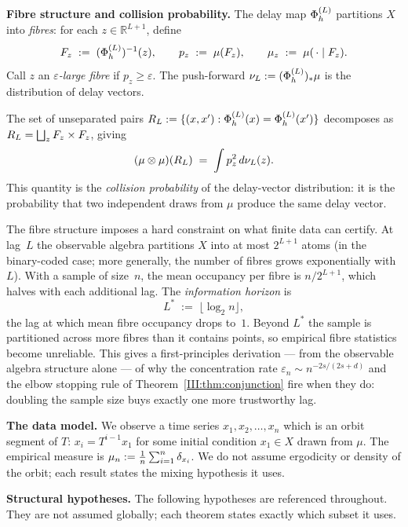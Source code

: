 \textbf{Fibre structure and collision probability.}\label{III:subsec:fibres}\enspace
The delay map $\Phi_h^{(L)}$ partitions $X$ into \emph{fibres}: for each
$z \in \mathbb{R}^{L+1}$, define
\[
  F_z \;:=\; (\Phi_h^{(L)})^{-1}(z), \qquad
  p_z \;:=\; \mu(F_z), \qquad
  \mu_z \;:=\; \mu(\,\cdot\mid F_z).
\]
Call $z$ an \emph{$\varepsilon$-large fibre} if $p_z \geq \varepsilon$.
The push-forward $\nu_L := (\Phi_h^{(L)})_*\mu$ is the distribution of
delay vectors.

The set of unseparated pairs $R_L := \{(x,x') : \Phi_h^{(L)}(x) = \Phi_h^{(L)}(x')\}$
decomposes as $R_L = \bigsqcup_z F_z \times F_z$, giving
\begin{equation}
  (\mu \otimes \mu)(R_L)
  \;=\; \int p_z^2\,d\nu_L(z).
  \label{III:eq:collision-prob}
\end{equation}
This quantity is the \emph{collision probability} of the delay-vector
distribution: it is the probability that two independent draws from $\mu$
produce the same delay vector.

\begin{remark}
\label{III:rem:info-horizon}
The fibre structure imposes a hard constraint on what finite data can certify.
At lag~$L$ the observable algebra partitions $X$ into at most $2^{L+1}$
atoms (in the binary-coded case; more generally, the number of fibres grows
exponentially with $L$).
With a sample of size~$n$, the mean occupancy per fibre is $n/2^{L+1}$, which
halves with each additional lag.
The \emph{information horizon} is
\[
  L^* \;:=\; \lfloor \log_2 n \rfloor,
\]
the lag at which mean fibre occupancy drops to~$1$.
Beyond $L^*$ the sample is partitioned across more fibres than it contains
points, so empirical fibre statistics become unreliable.
This gives a first-principles derivation --- from the observable algebra
structure alone --- of why the concentration rate $\varepsilon_n \sim n^{-2s/(2s+d)}$
and the elbow stopping rule of Theorem~\ref{III:thm:conjunction} fire when they do:
doubling the sample size buys exactly one more trustworthy lag.
\end{remark}

\textbf{The data model.}\enspace
We observe a time series $x_1, x_2, \ldots, x_n$ which is an orbit segment of
$T$: $x_i = T^{i-1}x_1$ for some initial condition $x_1 \in X$ drawn from
$\mu$.
The empirical measure is $\mu_n := \frac{1}{n}\sum_{i=1}^n \delta_{x_i}$.
We do not assume ergodicity or density of the orbit; each result states the
mixing hypothesis it uses.

\textbf{Structural hypotheses.}\enspace
The following hypotheses are referenced throughout.
They are not assumed globally; each theorem states exactly which subset it uses.

